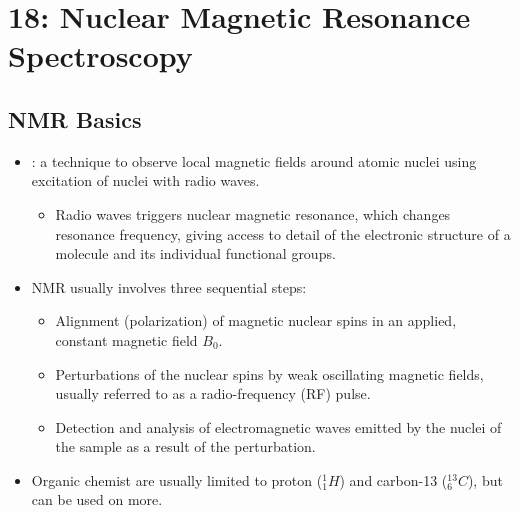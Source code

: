 \chapter{18: Nuclear Magnetic Resonance Spectroscopy}\label{18: Nuclear Magnetic Resonance Spectroscopy}
\section{NMR Basics}\label{NMR Basics}
\begin{itemize}
    \item {}: a technique to observe local magnetic fields around atomic nuclei using excitation of nuclei with radio waves.
      \begin{itemize}
        \item Radio waves triggers nuclear magnetic resonance, which changes resonance frequency, giving access to detail of the electronic structure of a molecule and its individual functional groups.
      \end{itemize}
    \item NMR usually involves three sequential steps:
      \begin{itemize}
        \item Alignment (polarization) of magnetic nuclear spins in an applied, constant magnetic field \(B_0\).
        \item Perturbations of the nuclear spins by weak oscillating magnetic fields, usually referred to as a radio-frequency (RF) pulse.
        \item Detection and analysis of electromagnetic waves emitted by the nuclei of the sample as a result of the perturbation.
      \end{itemize}
    \item Organic chemist are usually limited to proton (\(^1_1H\)) and carbon-13 (\(^{13}_6C\)), but can be used on more.
\end{itemize}

